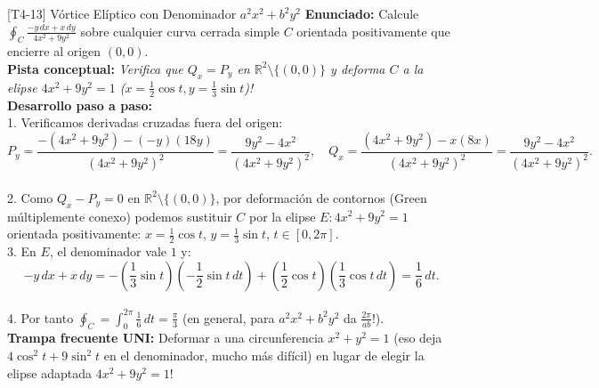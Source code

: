 \documentclass[11pt,a4paper]{article}
\begin{document}
\begin{ejerciciobox}{[T4-13] Vórtice Elíptico con Denominador $a^2 x^2 + b^2 y^2$}
\textbf{Enunciado:} Calcule $\oint_C \frac{-y\,dx + x\,dy}{4x^2 + 9y^2}$ sobre cualquier curva cerrada simple $C$ orientada positivamente que encierre al origen $(0,0)$.\\[0.2cm]
\textbf{Pista conceptual:} \emph{Verifica que $Q_x = P_y$ en $\mathbb{R}^2\setminus\{(0,0)\}$ y deforma $C$ a la elipse $4x^2 + 9y^2 = 1$ ($x = \frac{1}{2}\cos t, y = \frac{1}{3}\sin t$)!}\\[0.2cm]
\textbf{Desarrollo paso a paso:}\\
1. Verificamos derivadas cruzadas fuera del origen:\\
$$P_y = \frac{-(4x^2+9y^2) - (-y)(18y)}{(4x^2+9y^2)^2} = \frac{9y^2 - 4x^2}{(4x^2+9y^2)^2}, \quad Q_x = \frac{(4x^2+9y^2) - x(8x)}{(4x^2+9y^2)^2} = \frac{9y^2 - 4x^2}{(4x^2+9y^2)^2}.$$\\
2. Como $Q_x - P_y = 0$ en $\mathbb{R}^2\setminus\{(0,0)\}$, por deformación de contornos (Green múltiplemente conexo) podemos sustituir $C$ por la elipse $E: 4x^2 + 9y^2 = 1$ orientada positivamente: $x = \frac{1}{2}\cos t$, $y = \frac{1}{3}\sin t$, $t \in [0, 2\pi]$.\\
3. En $E$, el denominador vale $1$ y:\\
$$-y\,dx + x\,dy = -\left(\frac{1}{3}\sin t\right)\left(-\frac{1}{2}\sin t\,dt\right) + \left(\frac{1}{2}\cos t\right)\left(\frac{1}{3}\cos t\,dt\right) = \frac{1}{6}\,dt.$$\\
4. Por tanto $\oint_C = \int_0^{2\pi} \frac{1}{6}\,dt = \frac{\pi}{3}$ (en general, para $a^2x^2+b^2y^2$ da $\frac{2\pi}{ab}$!).\\[0.2cm]
\textbf{Trampa frecuente UNI:} Deformar a una circunferencia $x^2+y^2=1$ (eso deja $4\cos^2 t + 9\sin^2 t$ en el denominador, mucho más difícil) en lugar de elegir la elipse adaptada $4x^2+9y^2=1$!
\end{ejerciciobox}
\end{document}

